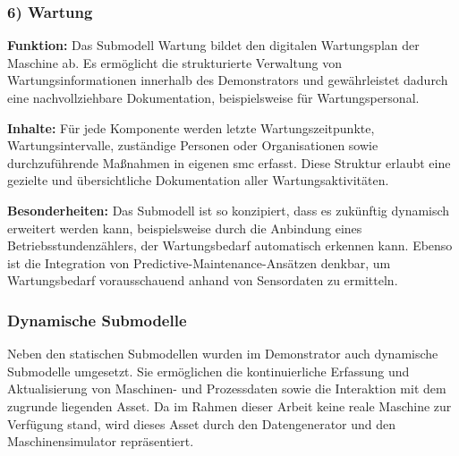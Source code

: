\subsubsection*{6) Wartung}
\vspace{-0.5em}
\textbf{Funktion:}  
Das Submodell Wartung bildet den digitalen Wartungsplan der Maschine ab.  
Es ermöglicht die strukturierte Verwaltung von Wartungsinformationen innerhalb des Demonstrators und gewährleistet dadurch eine nachvollziehbare Dokumentation, beispielsweise für Wartungspersonal.

\textbf{Inhalte:}  
Für jede Komponente werden letzte Wartungszeitpunkte, Wartungsintervalle, zuständige Personen oder Organisationen sowie durchzuführende Maßnahmen in eigenen \acs{smc} erfasst.  
Diese Struktur erlaubt eine gezielte und übersichtliche Dokumentation aller Wartungsaktivitäten.

\textbf{Besonderheiten:}  
Das Submodell ist so konzipiert, dass es zukünftig dynamisch erweitert werden kann, beispielsweise durch die Anbindung eines Betriebsstundenzählers, der Wartungsbedarf automatisch erkennen kann.  
Ebenso ist die Integration von Predictive-Maintenance-Ansätzen denkbar, um Wartungsbedarf vorausschauend anhand von Sensordaten zu ermitteln.


\newpage
\subsubsection{Dynamische Submodelle}
\label{sec:DynamischeSubmodelle}
Neben den statischen Submodellen wurden im Demonstrator auch dynamische Submodelle umgesetzt.
Sie ermöglichen die kontinuierliche Erfassung und Aktualisierung von Maschinen- und Prozessdaten sowie die Interaktion mit dem zugrunde liegenden Asset.
Da im Rahmen dieser Arbeit keine reale Maschine zur Verfügung stand, wird dieses Asset durch den Datengenerator und den Maschinensimulator repräsentiert.

